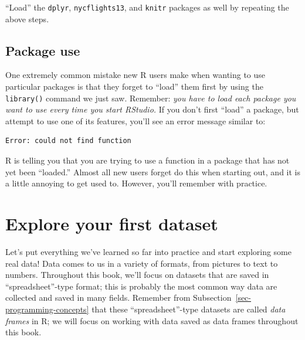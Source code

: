 \documentclass[
  letterpaper,
  DIV=11,
  numbers=noendperiod]{scrreprt}
\theoremstyle{definition}
\theoremstyle{remark}
\begin{document}
\begin{tcolorbox}[enhanced jigsaw, colback=white, toprule=.15mm, bottomrule=.15mm, titlerule=0mm, title={{🎯} Learning Check 1.2}, leftrule=.75mm, arc=.35mm, left=2mm, colframe=quarto-callout-tip-color-frame, coltitle=black, opacitybacktitle=0.6, bottomtitle=1mm, colbacktitle=quarto-callout-tip-color!10!white, opacityback=0, toptitle=1mm, rightrule=.15mm, breakable]

``Load'' the \texttt{dplyr}, \texttt{nycflights13}, and \texttt{knitr}
packages as well by repeating the above steps.

\end{tcolorbox}

\hypertarget{sec-package-use}{%
\subsection{Package use}\label{sec-package-use}}

One extremely common mistake new R users make when wanting to use
particular packages is that they forget to ``load'' them first by using
the \texttt{library()} command we just saw. Remember: \emph{you have to
load each package you want to use every time you start RStudio.} If you
don't first ``load'' a package, but attempt to use one of its features,
you'll see an error message similar to:

\begin{verbatim}
Error: could not find function
\end{verbatim}

R is telling you that you are trying to use a function in a package that
has not yet been ``loaded.'' Almost all new users forget do this when
starting out, and it is a little annoying to get used to. However,
you'll remember with practice.

\hypertarget{sec-nycflights13}{%
\section{Explore your first dataset}\label{sec-nycflights13}}

Let's put everything we've learned so far into practice and start
exploring some real data! Data comes to us in a variety of formats, from
pictures to text to numbers. Throughout this book, we'll focus on
datasets that are saved in ``spreadsheet''-type format; this is probably
the most common way data are collected and saved in many fields.
Remember from Subsection~\ref{sec-programming-concepts} that these
``spreadsheet''-type datasets are called \emph{data frames} in R; we
will focus on working with data saved as data frames throughout this
book.
\end{document}
